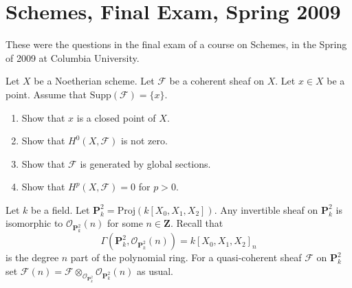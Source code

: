 \section{Schemes, Final Exam, Spring 2009}
\label{section-final-exam-spring-2009}

\noindent
These were the questions in the final exam of a course on Schemes,
in the Spring of 2009 at Columbia University.

\begin{exercise}
\label{exercise-Noetherian-coherent}
Let $X$ be a Noetherian scheme.
Let $\mathcal{F}$ be a coherent sheaf on $X$.
Let $x \in X$ be a point.
Assume that $\text{Supp}(\mathcal{F}) = \{ x \}$.
\begin{enumerate}
\item Show that $x$ is a closed point of $X$.
\item Show that $H^0(X, \mathcal{F})$ is not zero.
\item Show that $\mathcal{F}$ is generated by global sections.
\item Show that $H^p(X, \mathcal{F}) = 0$ for $p > 0$.
\end{enumerate}
\end{exercise}

\begin{remark}
\label{remark-invertible-projective-space}
Let $k$ be a field.
Let $\mathbf{P}^2_k = \text{Proj}(k[X_0, X_1, X_2])$.
Any invertible sheaf on $\mathbf{P}^2_k$ is isomorphic to
$\mathcal{O}_{\mathbf{P}^2_k}(n)$ for some $n \in \mathbf{Z}$.
Recall that
$$
\Gamma(\mathbf{P}^2_k, \mathcal{O}_{\mathbf{P}^2_k}(n)) =
k[X_0, X_1, X_2]_n
$$
is the degree $n$ part of the polynomial ring.
For a quasi-coherent sheaf $\mathcal{F}$ on $\mathbf{P}^2_k$ set
$\mathcal{F}(n) =
\mathcal{F}
\otimes_{\mathcal{O}_{\mathbf{P}^2_k}}
\mathcal{O}_{\mathbf{P}^2_k}(n)$
as usual.
\end{remark}


